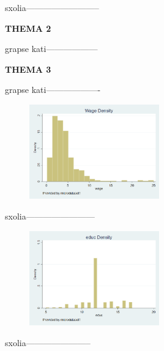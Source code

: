 \documentclass{article}
\begin{document}
	sxolia--------------------------
	
	\vspace {0.5\baselineskip}
	
	\large{\textbf{THEMA 2}}
	
	\vspace {0.5\baselineskip}
	
	grapse kati------------------
	
	\vspace {0.5\baselineskip}
	
	\large{\textbf{THEMA 3}}
	
	\vspace {0.5\baselineskip}
	
	grapse kati-------------------
	
	\vspace {0.5\baselineskip}
	
	\begin{figure}
		\centering
		\includegraphics[width=0.5\textwidth]{Wage density.png}
		\caption{\label{fig:plot} }
	\end{figure}
	
	\vspace {0.5\baselineskip}
	
	sxolia------------------------
	
	\vspace {0.5\baselineskip}
	
	\begin{figure}
		\centering
		\includegraphics[width=0.5\textwidth]{educ density.png}
		\caption{\label{fig:plot} }
	\end{figure}
	
	\vspace {0.5\baselineskip}
	
	sxolia-----------------------
	
	\vspace {0.5\baselineskip}
	
\end{document}
